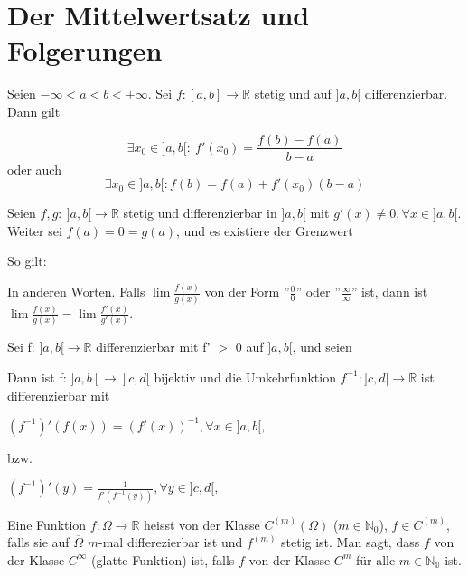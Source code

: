\section{Der Mittelwertsatz und Folgerungen}

\begin{theorem}[Mittelwertsatz]
    Seien $-\infty < a < b < +\infty$. Sei $f: [a,b] \rightarrow \mathbb{R}$ stetig und auf $]a,b[$ differenzierbar.
    Dann gilt

$$\exists x_0 \in ]a,b[: \ f'(x_0) = \frac{f(b)-f(a)}{b-a}$$
oder auch
$$\exists x_0 \in ]a,b[: f(b) = f(a) + f'(x_0)(b-a)$$
\end{theorem}

\begin{theorem}
	Seien $f,g: \ ]a,b[ \rightarrow \mathbb{R}$ stetig und differenzierbar in $]a,b[$ mit $g'(x)\neq 0, \forall x\in ]a,b[$. Weiter sei $f(a)= 0 = g(a)$, und es existiere der Grenzwert
	
		
	\raggedright{So gilt:}
	

In anderen Worten. Falls $\lim\frac{f(x)}{g(x)}$ von der Form ''$\frac{0}{0}$'' oder ''$\frac{\infty}{\infty}$'' ist, dann ist
$\lim\frac{f(x)}{g(x)}=\lim\frac{f'(x)}{g'(x)}$.
\end{theorem}

\begin{theorem}[Umkehrsatz]
Sei f: $]a,b[ \rightarrow \mathbb{R}$ differenzierbar mit f' $>$  0 auf $]a,b[$, und seien
	

	\raggedright Dann ist f: $]a,b[ \rightarrow ]c,d[$ bijektiv und die 		Umkehrfunktion $f^{-1}:  ]c,d[ \rightarrow \mathbb{R}$ ist differenzierbar mit

	\centering $(f^{-1})'(f(x)) = (f'(x))^{-1},  \forall x \in ]a,b[,$
    
    \raggedright bzw.
    
    \centering $(f^{-1})'(y) = \frac{1}{f'(f^{-1}(y))},  \forall y \in ]c,d[,$
\end{theorem}

\begin{definition}[$C^k$-Räume]
Eine Funktion $f: \Omega \rightarrow \mathbb{R}$ heisst von der Klasse $C^{(m)}(\Omega)$ ($m \in \mathbb{N}_0$), $f \in C^{(m)}$, falls sie auf $\overline{\Omega}$ $m$-mal differezierbar ist und $f^{(m)}$ stetig ist. Man sagt, dass $f$ von der Klasse $C^\infty$ (glatte Funktion) ist, falls $f$ von der Klasse $C^m$ für alle $m \in \mathbb{N_0}$ ist. 
\end{definition}

